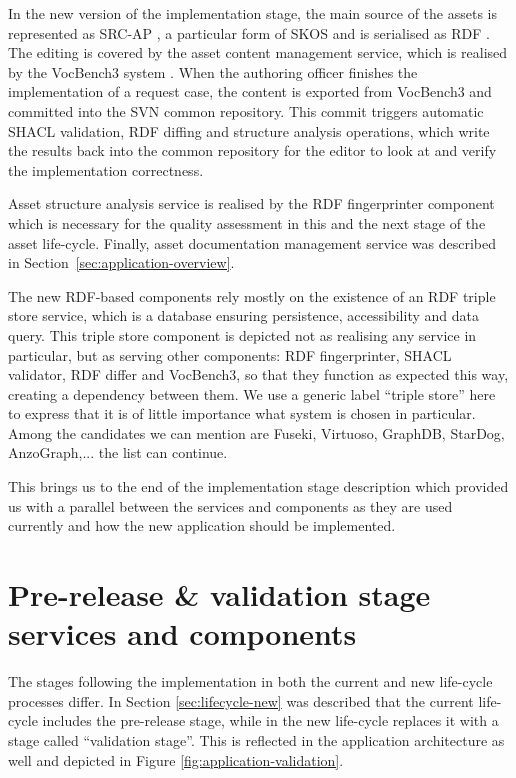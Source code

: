 	In the new version of the implementation stage, the main source of the assets is represented as SRC-AP \cite{src-ap-vb3}, a particular form of SKOS \citep{skos-spec} and is serialised as RDF \citep{rdf11}. The editing is covered by the asset content management service, which is realised by the VocBench3 system \citep{stellatovocbench}. When the authoring officer finishes the implementation of a request case, the content is exported from VocBench3 and committed into the SVN common repository. This commit triggers automatic SHACL validation, RDF diffing and structure analysis operations, which write the results back into the common repository for the editor to look at and verify the implementation correctness. 
	
	Asset structure analysis service is realised by the RDF fingerprinter component which is necessary for the quality assessment in this and the next stage of the asset life-cycle. Finally, asset documentation management service was described in \mbox{Section \ref{sec:application-overview}.}
	
	The new RDF-based components rely mostly on the existence of an RDF triple store service, which is a database ensuring persistence, accessibility and data query. This triple store component is depicted not as realising any service in particular, but as serving other components: RDF fingerprinter, SHACL validator, RDF differ and VocBench3, so that they function as expected this way, creating a dependency between them. We use a generic label ``triple store'' here to express that it is of little importance what system is chosen in particular. Among the candidates we can mention are Fuseki, Virtuoso, GraphDB, StarDog, AnzoGraph,... the list can continue. 
	
	This brings us to the end of the implementation stage description which provided us with a parallel between the services and components as they are used currently and how the new application should be implemented. 
	
	\section{Pre-release \& validation stage services and components}
	\label{sec:validation-application}
	
	The stages following the implementation in both the current and new life-cycle processes differ. In Section \ref{sec:lifecycle-new} was described that the current life-cycle includes the pre-release stage, while in the new life-cycle replaces it with a stage called ``validation stage''. This is reflected in the application architecture as well and depicted in Figure \ref{fig:application-validation}.
	
